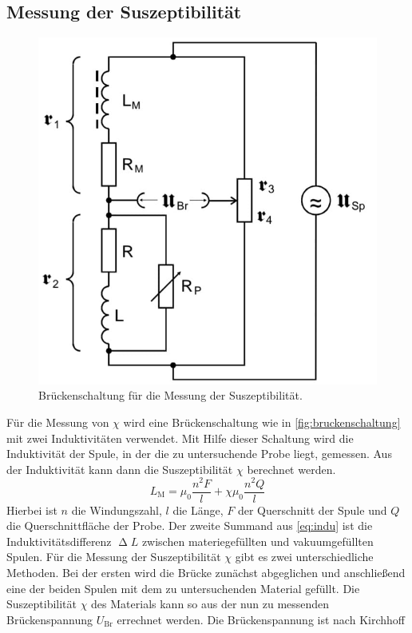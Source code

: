 \subsection{Messung der Suszeptibilität}
\begin{figure}[H]
	\centering
	\includegraphics[width=0.7\linewidth]{data/brueckenschaltung.jpeg}
	\caption{Brückenschaltung für die Messung der Suszeptibilität.}
	\label{fig:bruckenschaltung}
\end{figure}
Für die Messung von $\chi$ wird eine Brückenschaltung wie in \autoref{fig:bruckenschaltung} mit zwei Induktivitäten verwendet. Mit Hilfe dieser Schaltung wird die
Induktivität der Spule, in der die zu untersuchende Probe liegt, gemessen.
\newline
Aus der Induktivität kann dann die Suszeptibilität $\chi$ berechnet werden.
\begin{equation}
\label{eq:indu}
L_\text{M} = \mu_0 \frac{n^2F}{l} + \chi \mu_0 \frac{n^2Q}{l}
\end{equation}
Hierbei ist $n$ die Windungszahl, $l$ die Länge, $F$ der Querschnitt der Spule und $Q$ die Querschnittfläche der Probe.
Der zweite Summand aus \autoref{eq:indu} ist die Induktivitätsdifferenz $\upDelta L$ zwischen materiegefüllten und vakuumgefüllten Spulen.
\newline
Für die Messung der Suszeptibilität $\chi$ gibt es zwei unterschiedliche Methoden.
Bei der ersten wird die Brücke zunächst abgeglichen und anschließend eine der beiden Spulen mit dem zu untersuchenden
Material gefüllt. Die Suszeptibilität $\chi$ des Materials kann so aus der nun zu messenden Brückenspannung $U_\text{Br}$ errechnet werden.
Die Brückenspannung ist nach Kirchhoff
